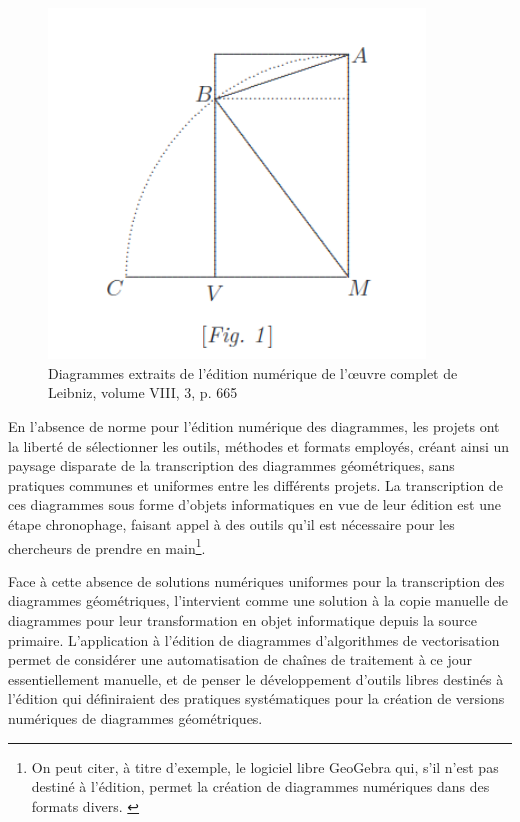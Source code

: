 	\begin{figure}[h]
		\centering
		\includegraphics[width=10cm]{images/leibniz_diag.png}
		\caption{Diagrammes extraits de l'édition numérique de l'œuvre complet de Leibniz, volume VIII, 3, p. 665}
		\label{fig:leibniz_diag}
	\end{figure}

	En l'absence de norme pour l'édition numérique des diagrammes, les projets ont la liberté de sélectionner les outils, méthodes et formats employés, créant ainsi un paysage disparate de la transcription des diagrammes géométriques, sans pratiques communes et uniformes entre les différents projets. La transcription de ces diagrammes sous forme d'objets informatiques en vue de leur édition est une étape chronophage, faisant appel à des outils qu'il est nécessaire pour les chercheurs de prendre en main\footnote{On peut citer, à titre d'exemple, le logiciel libre GeoGebra qui, s'il n'est pas destiné à l'édition, permet la création de diagrammes numériques dans des formats divers. \cite{GeoGebra}}.
	
	Face à cette absence de solutions numériques uniformes pour la transcription des diagrammes géométriques, l'\ia intervient comme une solution à la copie manuelle de diagrammes pour leur transformation en objet informatique depuis la source primaire. L'application à l'édition de diagrammes d'algorithmes de vectorisation permet de considérer une automatisation de chaînes de traitement à ce jour essentiellement manuelle, et de penser le développement d'outils libres destinés à l'édition qui définiraient des pratiques systématiques pour la création de versions numériques de diagrammes géométriques.

